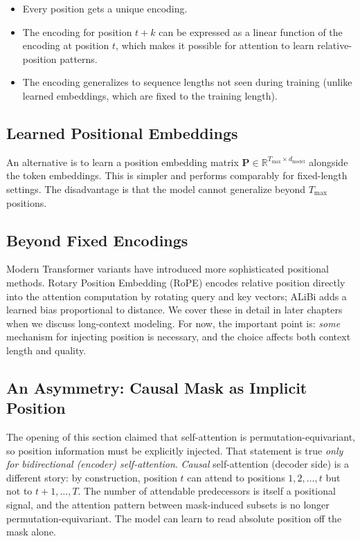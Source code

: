 \begin{itemize}
    \item Every position gets a unique encoding.
    \item The encoding for position $t + k$ can be expressed as a linear function of the encoding at position $t$, which makes it possible for attention to learn relative-position patterns.
    \item The encoding generalizes to sequence lengths not seen during training (unlike learned embeddings, which are fixed to the training length).
\end{itemize}

\subsection{Learned Positional Embeddings}

An alternative is to learn a position embedding matrix $\mathbf{P} \in \mathbb{R}^{T_{\max} \times d_{\text{model}}}$ alongside the token embeddings. This is simpler and performs comparably for fixed-length settings. The disadvantage is that the model cannot generalize beyond $T_{\max}$ positions.

\subsection{Beyond Fixed Encodings}

Modern Transformer variants have introduced more sophisticated positional methods. Rotary Position Embedding (RoPE) encodes relative position directly into the attention computation by rotating query and key vectors; ALiBi adds a learned bias proportional to distance. We cover these in detail in later chapters when we discuss long-context modeling. For now, the important point is: \emph{some} mechanism for injecting position is necessary, and the choice affects both context length and quality.

\subsection{An Asymmetry: Causal Mask as Implicit Position}
\label{sec:causal-mask-implicit-position}

The opening of this section claimed that self-attention is permutation-equivariant, so position information must be explicitly injected. That statement is true \emph{only for bidirectional (encoder) self-attention}. \emph{Causal} self-attention (decoder side) is a different story: by construction, position $t$ can attend to positions $1, 2, \ldots, t$ but not to $t+1, \ldots, T$. The number of attendable predecessors is itself a positional signal, and the attention pattern between mask-induced subsets is no longer permutation-equivariant. The model can learn to read absolute position off the mask alone.

